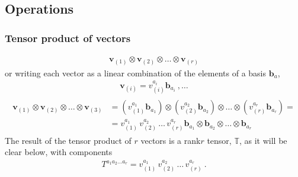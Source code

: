 \documentclass[letterpaper,10pt,english]{jupyterBook}
\begin{document}
\subsection{Operations}
\label{\detokenize{ch/tensor-algebra-calculus/algebra:operations}}

\subsubsection{Tensor product of vectors}
\label{\detokenize{ch/tensor-algebra-calculus/algebra:tensor-product-of-vectors}}\begin{equation*}
\begin{split}\mathbf{v}_{(1)} \otimes \mathbf{v}_{(2)} \otimes \dots \otimes \mathbf{v}_{(r)}\end{split}
\end{equation*}
\sphinxAtStartPar
or writing each vector as a linear combination of the elements of a basis \(\mathbf{b}_a\),
\begin{equation*}
\begin{split}\mathbf{v}_{(i)} = v_{(i)}^{a_i} \mathbf{b}_{a_i} \ , \dots\end{split}
\end{equation*}\begin{equation*}
\begin{split}\begin{aligned}
  \mathbf{v}_{(1)} \otimes \mathbf{v}_{(2)} \otimes \dots \otimes \mathbf{v}_{(3)}
  & = \left(  v_{(1)}^{a_1} \mathbf{b}_{a_1} \right) \otimes \left(  v_{(2)}^{a_2} \mathbf{b}_{a_2} \right) \otimes \dots \otimes \left( v_{(r)}^{a_r} \mathbf{b}_{a_r} \right) = \\
  & = v_{(1)}^{a_1} \, v_{(2)}^{a_2} \, \dots \, v_{(r)}^{a_r} \mathbf{b}_{a_1} \otimes \mathbf{b}_{a_2} \otimes \dots \otimes \mathbf{b}_{a_r}
\end{aligned}\end{split}
\end{equation*}
\sphinxAtStartPar
The result of the tensor product of \(r\) vectors is a rank\sphinxhyphen{}\(r\) tensor, \(\mathbb{T}\), as it will be clear below, with components
\begin{equation*}
\begin{split}T^{a_1 a_2 \dots a_r} = v_{(1)}^{a_1} \, v_{(2)}^{a_2} \, \dots \, v_{(r)}^{a_r} \ .\end{split}
\end{equation*}
\end{document}
